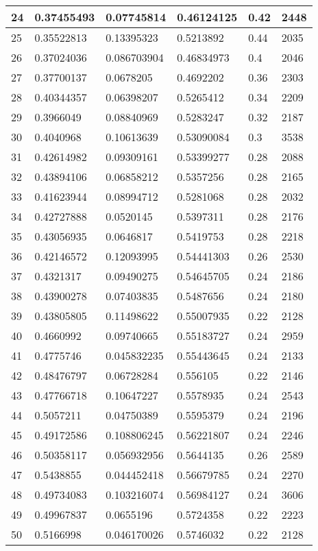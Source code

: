 \begin{longtable}{|l|l|l|l|l|l|}
24 & 0.37455493 & 0.07745814 & 0.46124125 & 0.42 & 2448 \\ \hline 
25 & 0.35522813 & 0.13395323 & 0.5213892 & 0.44 & 2035 \\ \hline 
26 & 0.37024036 & 0.086703904 & 0.46834973 & 0.4 & 2046 \\ \hline 
27 & 0.37700137 & 0.0678205 & 0.4692202 & 0.36 & 2303 \\ \hline 
28 & 0.40344357 & 0.06398207 & 0.5265412 & 0.34 & 2209 \\ \hline 
29 & 0.3966049 & 0.08840969 & 0.5283247 & 0.32 & 2187 \\ \hline 
30 & 0.4040968 & 0.10613639 & 0.53090084 & 0.3 & 3538 \\ \hline 
31 & 0.42614982 & 0.09309161 & 0.53399277 & 0.28 & 2088 \\ \hline 
32 & 0.43894106 & 0.06858212 & 0.5357256 & 0.28 & 2165 \\ \hline 
33 & 0.41623944 & 0.08994712 & 0.5281068 & 0.28 & 2032 \\ \hline 
34 & 0.42727888 & 0.0520145 & 0.5397311 & 0.28 & 2176 \\ \hline 
35 & 0.43056935 & 0.0646817 & 0.5419753 & 0.28 & 2218 \\ \hline 
36 & 0.42146572 & 0.12093995 & 0.54441303 & 0.26 & 2530 \\ \hline 
37 & 0.4321317 & 0.09490275 & 0.54645705 & 0.24 & 2186 \\ \hline 
38 & 0.43900278 & 0.07403835 & 0.5487656 & 0.24 & 2180 \\ \hline 
39 & 0.43805805 & 0.11498622 & 0.55007935 & 0.22 & 2128 \\ \hline 
40 & 0.4660992 & 0.09740665 & 0.55183727 & 0.24 & 2959 \\ \hline 
41 & 0.4775746 & 0.045832235 & 0.55443645 & 0.24 & 2133 \\ \hline 
42 & 0.48476797 & 0.06728284 & 0.556105 & 0.22 & 2146 \\ \hline 
43 & 0.47766718 & 0.10647227 & 0.5578935 & 0.24 & 2543 \\ \hline 
44 & 0.5057211 & 0.04750389 & 0.5595379 & 0.24 & 2196 \\ \hline 
45 & 0.49172586 & 0.108806245 & 0.56221807 & 0.24 & 2246 \\ \hline 
46 & 0.50358117 & 0.056932956 & 0.5644135 & 0.26 & 2589 \\ \hline 
47 & 0.5438855 & 0.044452418 & 0.56679785 & 0.24 & 2270 \\ \hline 
48 & 0.49734083 & 0.103216074 & 0.56984127 & 0.24 & 3606 \\ \hline 
49 & 0.49967837 & 0.0655196 & 0.5724358 & 0.22 & 2223 \\ \hline 
50 & 0.5166998 & 0.046170026 & 0.5746032 & 0.22 & 2128 \\ \hline 
\end{longtable}